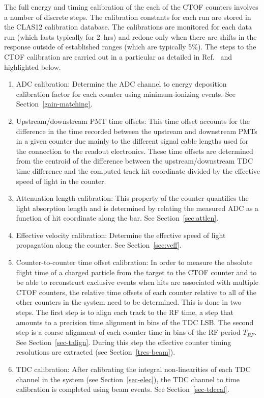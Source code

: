 \documentclass{elsart}
\begin{document}
The full energy and timing calibration of the each of the CTOF counters involves a number of discrete
steps. The calibration constants for each run are stored in the CLAS12 calibration database. The
calibrations are monitored for each data run (which lasts typically for 2~hrs) and redone only when
there are shifts in the response outside of established ranges (which are typically 5\%). The steps
to the CTOF calibration are carried out in a particular as detailed in Ref.~\cite{ctof-calib} and
highlighted below.

\begin{enumerate}
\item ADC calibration: Determine the ADC channel to energy deposition calibration factor for each
counter using minimum-ionizing events. See Section~\ref{gain-matching}.

\item Upstream/downstream PMT time offsets: This time offset accounts for the difference in the time
recorded between the upstream and downstream PMTs in a given counter due mainly to the different
signal cable lengths used for the connection to the readout electronics. These time offsets are determined
from the centroid of the difference between the upstream/downstream TDC time difference and the
computed track hit coordinate divided by the effective speed of light in the counter. 

\item Attenuation length calibration: This property of the counter quantifies the light absorption length
and is determined by relating the measured ADC as a function of hit coordinate along the bar. See
Section~\ref{sec:attlen}.

\item Effective velocity calibration: Determine the effective speed of light propagation along the
counter. See Section~\ref{sec:veff}.

\item Counter-to-counter time offset calibration: In order to measure the absolute flight time of a
charged particle from the target to the CTOF counter and to be able to reconstruct exclusive events
when hits are associated with multiple CTOF counters, the relative time offsets of each counter relative
to all of the other counters in the system need to be determined. This is done in two steps. The first
step is to align each track to the RF time, a step that amounts to a precision time alignment in bins of
the TDC LSB. The second step is a coarse alignment of each counter time in bins of the RF period
$T_{RF}$. See Section~\ref{sec-talign}. During this step the effective counter timing resolutions are
extracted (see Section~\ref{tres-beam}).

\item TDC calibration: After calibrating the integral non-linearities of each TDC channel in the system
(see Section~\ref{sec-elec}), the TDC channel to time calibration is completed using beam events. See
Section~\ref{sec-tdccal}.

\end{enumerate}
\end{document}
